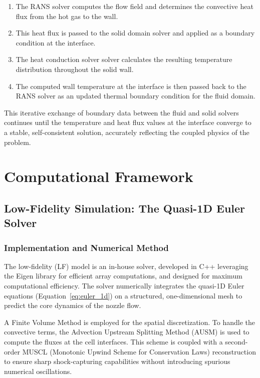 \documentclass[tg, EN]{ufabcFHZh_tg}
\begin{document}
\begin{enumerate}
    \item The RANS solver computes the flow field and determines the convective heat flux from the hot gas to the wall.
    \item This heat flux is passed to the solid domain solver and applied as a boundary condition at the interface.
    \item The heat conduction solver solver calculates the resulting temperature distribution throughout the solid wall.
    \item The computed wall temperature at the interface is then passed back to the RANS solver as an updated thermal boundary condition for the fluid domain.
\end{enumerate}

This iterative exchange of boundary data between the fluid and solid solvers continues until the temperature and heat flux values at the interface converge to a stable, self-consistent solution, accurately reflecting the coupled physics of the problem.

\chapter{Computational Framework}
\label{chap:computational_framework}

\section{Low-Fidelity Simulation: The Quasi-1D Euler Solver}
\label{sec:lf_model}

\subsection{Implementation and Numerical Method}

The low-fidelity (LF) model is an in-house solver, developed in C++ leveraging the Eigen library for efficient array computations, and designed for maximum computational efficiency. The solver numerically integrates the quasi-1D Euler equations (Equation~\ref{eq:euler_1d}) on a structured, one-dimensional mesh to predict the core dynamics of the nozzle flow.

A Finite Volume Method is employed for the spatial discretization. To handle the convective terms, the Advection Upstream Splitting Method (AUSM) is used to compute the fluxes at the cell interfaces. This scheme is coupled with a second-order MUSCL (Monotonic Upwind Scheme for Conservation Laws) reconstruction to ensure sharp shock-capturing capabilities without introducing spurious numerical oscillations.
\end{document}
